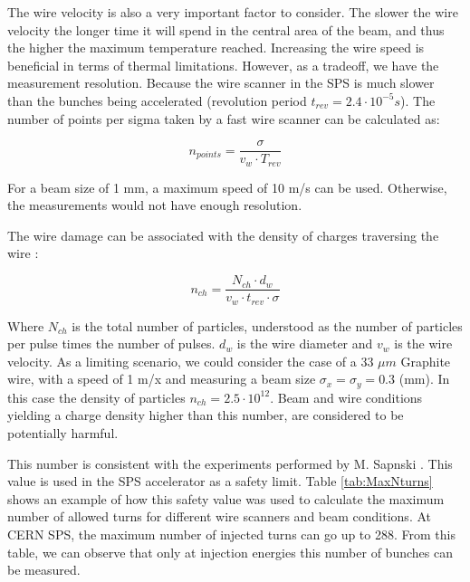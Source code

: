 The wire velocity is also a very important factor to consider. The slower the wire velocity the longer time it will spend in the central area of the beam, and thus the higher the maximum temperature reached. Increasing the wire speed is beneficial in terms of thermal limitations. However, as a tradeoff, we have the measurement resolution. Because the wire scanner in the SPS is much slower than the bunches being accelerated (revolution period $t_{rev} = 2.4\cdot 10^{-5} s$). The number of points per sigma taken by a fast wire scanner can be calculated as: 

\begin{equation}
    n_{points} = \frac{\sigma}{v_{w}\cdot T_{rev}}
\end{equation}

For a beam size of 1 mm, a maximum speed of 10 m/s can be used. Otherwise, the measurements would not have enough resolution. 

The wire damage can be associated with the density of charges traversing the wire \parencite[][]{ref:Msapinski}:

\begin{equation}
     n_{ch} = \frac{N_{ch} \cdot d_{w}}{v_{w} \cdot t_{rev} \cdot \sigma}
\end{equation}

Where $N_{ch}$ is the total number of particles, understood as the number of particles per pulse times the number of pulses. $d_w$ is the wire diameter and $v_w$ is the wire velocity. As a limiting scenario, we could consider the case of a 33 $\mu m$ Graphite wire, with a speed of 1 m/x and measuring a beam size $\sigma_x = \sigma_y = 0.3$ (mm).   In this case the density of particles $n_{ch} = 2.5\cdot 10^{12}$. Beam and wire conditions yielding a charge density higher than this number, are considered to be potentially harmful.

This number is consistent with the experiments performed by M. Sapnski \parencite[][]{ref:Msapinski}. This value is used in the SPS accelerator as a safety limit. Table \ref{tab:MaxNturns} shows an example of how this safety value was used to calculate the maximum number of allowed turns for different wire scanners and beam conditions. At CERN SPS, the maximum number of injected turns can go up to 288. From this table, we can observe that only at injection energies this number of bunches can be measured. 

